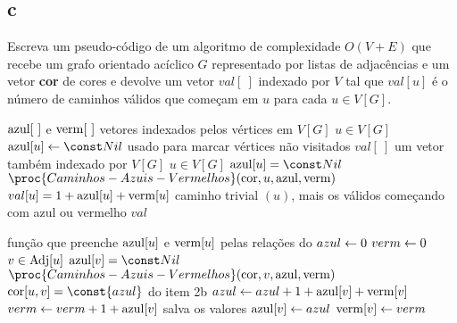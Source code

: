 \subsection{c} Escreva um pseudo-código de um algoritmo de complexidade $O(V +E)$ que recebe um grafo orientado acíclico $G$ representado por listas de adjacências e um vetor \textbf{cor} de cores e devolve um vetor $val[~]$ indexado por $V$ tal que $val[u]$ é o número de caminhos válidos que começam em $u$ para cada $u \in V[G]$.

\itemdsep[0.25]


\newcommand{\Azul}{\const{azul}\xspace}
\newcommand{\Vermelho}{\const{vermelho}\xspace}

\begin{codebox}
\li \Sejam $\mathrm{azul}[~]$ e $\mathrm{verm}[~]$ vetores indexados pelos vértices em $V[G]$
\li \Para $u \in V[G]$ \Faca        \label{linha:2c:init}
    \Do
\li     $\azul[u] \Recebe \Nulo$    \label{linha:2c:init:end}
        \>\>\>\>\>\Comment usado para marcar vértices não visitados
    \End
\li
\li \Seja $val[~]$ um vetor também indexado por $V[G]$
\li \Para $u \in V[G]$ \Faca        \label{linha:2c:preenche}
    \Do
\li     \Se $\azul[u] = \Nulo$ \Entao
        \Do
\li         $\proc{Caminhos-Azuis-Vermelhos}(\cor, u, \azul, \verm)$    \label{linha:2c:preenche:chamada}
        \End
\li
\li     $val[u] = 1 + \mathrm{azul}[u] + \mathrm{verm}[u]$  \label{linha:2c:preenche:end}
\li     \Comment caminho trivial $(u)$, mais os válidos começando com azul ou vermelho
    \End
\li \Retorna $val$
\end{codebox}

\begin{codebox}
\li \Comment função que preenche $\mathrm{azul}[u]$ e $\mathrm{verm}[u]$ pelas relações do 
\li
\li $azul \leftarrow 0$
\li $verm \leftarrow 0$
\li \Para $v \in \operatorname{Adj}[u]$ \Faca \label{linha:2c:calc}
    \Do
\li     \Se $\azul[v] = \Nulo$ \Entao
        \Do
\li         $\proc{Caminhos-Azuis-Vermelhos}(\cor, v, \azul, \verm)$    \label{linha:2c:calc:chamada}
        \End
\li
\li     \Se $\cor[u,v] = \Azul$
        \>\>\>\>\>\>\>\Comment do item 2b
        \Do
\li         \Entao $azul \leftarrow azul + 1 + \mathrm{azul}[v] + \mathrm{verm}[v]$
\li         \Senao $verm \leftarrow verm + 1 + \mathrm{azul}[v]$ \label{linha:2c:calc:end}
        \End
    \End
\li
\li \Comment salva os valores
\li $\mathrm{azul}[v] \leftarrow azul$
\li $\mathrm{verm}[v] \leftarrow verm$
\end{codebox}
